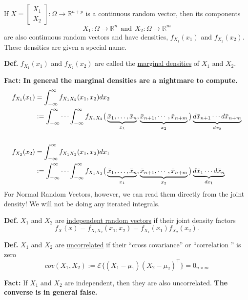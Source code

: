 \documentclass[letterpaper]{article}
\newcommand{\real}{\mathbb R}  %
\newcommand{\E}{\mathcal{E}}
\begin{document}
\newpage


If $X = \left[ \begin{array}{cc} X_1 \\
                                               X_2 \end{array} \right] :\Omega \to \real^{n+p}$ is a continuous random vector, then its components
                                               $$X_1:\Omega \to \real^n~~\text{and}~~X_2: \Omega \to \real^m$$ are also continuous random vectors and have densities, $f_{X_1}(x_1)$ and $f_{X_2}(x_2)$. These densities are given a special name.


 \textbf{Def.} $f_{X_1}(x_1)$ and $f_{X_2}(x_2)$  are called the \ul{marginal densities} of $X_1$ and $X_2$.

 \textbf{Fact: In general the marginal densities are a nightmare to compute.}  \begin{align*} f_{X_1}(x_1) &= \int_{-\infty}^{\infty} f_{X_1 X_2}(x_1, x_2) d x_2  \medskip \\
 &: =\int_{-\infty}^{\infty} \cdots \int_{-\infty}^{\infty} f_{X_1X_2}\big( \underbrace{ \bar{x}_1, \ldots, \bar{x}_n }_{x_1}, \underbrace{ \bar{x}_{n+1} , \cdots, \bar{x}_{n+m}}_{x_2} \big) \underbrace{d\bar{x}_{n+1} \cdots d\bar{x}_{n+m}}_{dx_2}\\
 \\
 f_{X_2}(x_2) &= \int_{-\infty}^{\infty} f_{X_1 X_2}(x_1, x_2) d x_1  \medskip \\
 &: =\int_{-\infty}^{\infty} \cdots \int_{-\infty}^{\infty} f_{X_1X_2}\big( \underbrace{ \bar{x}_1, \ldots, \bar{x}_n }_{x_1}, \underbrace{ \bar{x}_{n+1} , \cdots, \bar{x}_{n+m}}_{x_2} \big) \underbrace{d\bar{x}_{1} \cdots d\bar{x}_{n}}_{dx_1}\\
\end{align*}
For Normal Random Vectors, however, we can read them directly from the joint density! We will not be doing any iterated integrals.


        \noindent
        \textbf{Def. }$X_1$ and $X_2$ are \ul{independent random vectors} if their joint density factors
        $$f_X(x)=f_{X_1 X_2}(x_1,x_2)=f_{X_1}(x_1)f_{X_2}(x_2).$$

                \textbf{Def. }$X_1$ and $X_2$ are \ul{uncorrelated} if their ``cross covariance'' or ``correlation '' is zero
        $$cov(X_1,X_2) := \E \{ (X_1-\mu_1)(X_2-\mu_2)^\top \} = 0_{n \times m}$$

                        \textbf{Fact:} If $X_1$ and $X_2$ are independent, then they are also uncorrelated. \textbf{The converse is in general false.}
\end{document}
